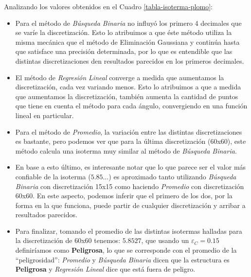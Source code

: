 Analizando los valores obtenidos en el Cuadro \ref{tabla-isoterma-plomo}:
\begin{itemize}
    \item Para el método de \textit{Búsqueda Binaria} no influyó los primero 4 decimales que se varíe la discretización. Esto lo atribuimos a que éste método utiliza la misma mecánica que el método de Eliminación Gaussiana y continúa hasta que satisface una precisión determinada, por lo que es entendible que las distintas discretizaciones den resultados parecidos en los primeros decimales.
    \item El método de \textit{Regresión Lineal} converge a medida que aumentamos la discretización, cada vez variando menos. Esto lo atribuimos a que a medida que aumentamos la discretización, también aumenta la cantidad de puntos que tiene en cuenta el método para cada ángulo, convergiendo en una función lineal en particular.
    \item Para el método de \textit{Promedio}, la variación entre las distintas
		discretizaciones es bastante, pero podemos ver que para la última discretización (60x60), este método calcula una isoterma muy similar al método de \textit{Búsqueda Binaria}.
    \item En base a esto último, es interesante notar que lo que parece ser el valor más confiable de la isoterma ($5.85\dots$) es aproximado tanto utilizando \textit{Búsqueda Binaria} con discretización 15x15 como haciendo \textit{Promedio} con discretización 60x60. En este aspecto, podemos inferir que el primero de los dos, por la forma en la que funciona, puede partir de cualquier discretización y arribar a resultados parecidos.
    \item Para finalizar, tomando el promedio de las distintas isotermas halladas para la discretización de 60x60 tenemos: $5.8527$, que usando un $\varepsilon_C = 0.15$ definiríamos como \textbf{Peligrosa}, lo que se corresponde con el promedio de la ``peligrosidad'': \textit{Promedio} y \textit{Búsqueda Binaria} dicen que la estructura es \textbf{Peligrosa} y \textit{Regresión Lineal} dice que está fuera de peligro.
\end{itemize}


